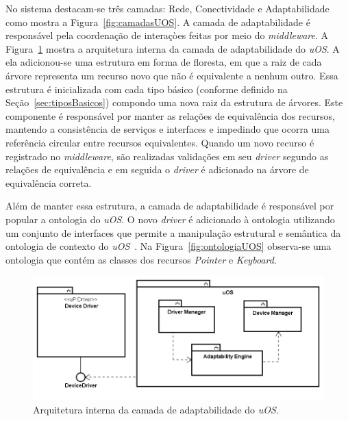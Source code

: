 No sistema destacam-se três camadas: Rede, Conectividade e Adaptabilidade como mostra a Figura~\ref{fig:camadasUOS}. A camada de adaptabilidade é responsável pela coordenação de interaçòes feitas por meio do \emph{middleware}. A Figura~\ref{fig:diagramaDeBlocos} mostra a arquitetura interna da camada de adaptabilidade do \emph{uOS}. A ela adicionou-se uma estrutura em forma de floresta, em que a raiz de cada árvore representa um recurso novo que não é equivalente a nenhum outro. Essa estrutura é inicializada com cada tipo básico (conforme definido na Seção~\ref{sec:tiposBasicos}) compondo uma nova raiz da estrutura de árvores. Este componente é responsável por manter as relações de equivalência dos recursos, mantendo a consistência de serviços e interfaces e impedindo que ocorra uma referência circular entre recursos equivalentes. Quando um novo recurso é registrado no \emph{middleware}, são realizadas validações em seu \emph{driver} segundo as relações de equivalência e em seguida o \emph{driver} é adicionado na árvore de equivalência correta.

Além de manter essa estrutura, a camada de adaptabilidade é responsável por popular a ontologia do \emph{uOS}. O novo \emph{driver} é adicionado à ontologia utilizando um conjunto de interfaces que permite a manipulação estrutural e semântica da ontologia de contexto do \emph{uOS}~\cite{ozakisbcup2011}. Na Figura~\ref{fig:ontologiaUOS} observa-se uma ontologia que contém as classes dos recursos \emph{Pointer} e \emph{Keyboard}.

\begin{figure}[ht]
	\center
	\includegraphics[scale=0.6]{imagens/diagramaDeBlocos}
	\caption{Arquitetura interna da camada de adaptabilidade do \emph{uOS}.}
	\label{fig:diagramaDeBlocos}
\end{figure}

